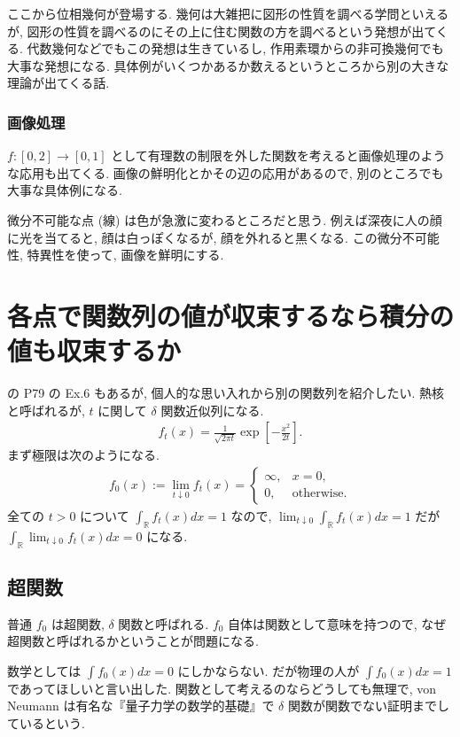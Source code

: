 \documentclass[openany, a4paper, oneside]{book}
\theoremstyle{break}
\theoremstyle{breakdefn}
\begin{document}
ここから位相幾何が登場する.
幾何は大雑把に図形の性質を調べる学問といえるが, 図形の性質を調べるのにその上に住む関数の方を調べるという発想が出てくる.
代数幾何などでもこの発想は生きているし, 作用素環からの非可換幾何でも大事な発想になる.
具体例がいくつかあるか数えるというところから別の大きな理論が出てくる話.
\subsubsection{画像処理}
\label{sec-11-3-7-3-2}

$f \colon [0,2] \to [0,1]$ として有理数の制限を外した関数を考えると画像処理のような応用も出てくる.
画像の鮮明化とかその辺の応用があるので, 別のところでも大事な具体例になる.

微分不可能な点 (線) は色が急激に変わるところだと思う.
例えば深夜に人の顔に光を当てると, 顔は白っぽくなるが, 顔を外れると黒くなる.
この微分不可能性, 特異性を使って, 画像を鮮明にする.
\section{各点で関数列の値が収束するなら積分の値も収束するか}
\label{sec-11-3-8}

\cite{GelbaumOlmsted1} の P79 の Ex.6 もあるが, 個人的な思い入れから別の関数列を紹介したい.
熱核と呼ばれるが, $t$ に関して $\delta$ 関数近似列になる.
\begin{align}
 f_t (x)
 =
 \frac{1}{\sqrt{2 \pi t}} \exp \left[ - \frac{x^2}{2t} \right].
\end{align}
まず極限は次のようになる.
\begin{align}
 f_0 (x)
 :=
 \lim_{t \downarrow 0} f_t (x)
 =
 \begin{cases}
  \infty, & x = 0, \\
  0,      & \mathrm{otherwise}.
 \end{cases}
\end{align}
全ての $t > 0$ について $\int_{\mathbb{R}} f_t (x) dx = 1$ なので,
$\lim_{t \downarrow 0} \int_{\mathbb{R}} f_t (x) dx = 1$ だが
$\int_{\mathbb{R}} \lim_{t \downarrow 0} f_t (x) dx = 0$ になる.
\subsection{超関数}
\label{sec-11-3-8-1}

普通 $f_0$ は超関数, $\delta$ 関数と呼ばれる.
$f_0$ 自体は関数として意味を持つので, なぜ超関数と呼ばれるかということが問題になる.

数学としては $\int f_0 (x) dx = 0$ にしかならない.
だが物理の人が $\int f_0 (x) dx = 1$ であってほしいと言い出した.
関数として考えるのならどうしても無理で, von Neumann は有名な『量子力学の数学的基礎』で $\delta$ 関数が関数でない証明までしているという.
\end{document}
